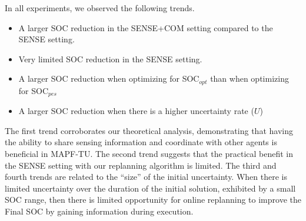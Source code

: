 \documentclass[jair,twoside,11pt,theapa]{article}
\newcommand{\mapftu}{MAPF-TU\xspace}
\newcommand{\sense}{SENSE\xspace}
\newcommand{\sensecom}{SENSE+COM\xspace}
\newcommand{\socopt}{SOC$_{opt}$\xspace}
\newcommand{\socpes}{SOC$_{pes}$\xspace}
\begin{document}
In all experiments, 
we observed the following trends.
\begin{itemize}
    \item A larger SOC reduction in the \sensecom setting compared to the \sense setting. 
    \item Very limited SOC reduction in the \sense setting. 
    \item A larger SOC reduction when optimizing for \socopt than when optimizing for \socpes
    \item A larger SOC reduction when there is a higher uncertainty rate ($U$)
\end{itemize}
The first trend corroborates our theoretical analysis, demonstrating that having the ability to share sensing information and coordinate with other agents is beneficial in \mapftu. 
The second trend suggests that the practical benefit in the \sense setting with our replanning algorithm is limited. 
The third and fourth trends are related to the ``size'' of the initial uncertainty. When there is limited uncertainty over the duration of the initial solution, exhibited by a small SOC range, then there is limited opportunity for online replanning to improve the Final SOC by gaining information during execution. 



\end{document}
